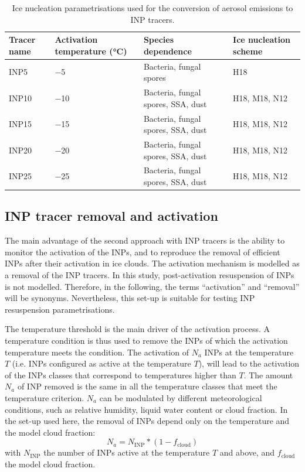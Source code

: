      \begin{table}[htb]
        \centering
        \caption{Ice nucleation parametrisations used for the conversion of aerosol emissions to INP tracers.}
        \begin{tabular}{m{2.5cm}|m{2.75cm}m{6cm}m{3cm}}
        \toprule
        Tracer name & Activation temperature (°C) & Species dependence  &  Ice nucleation scheme \\
        \midrule
        INP5 & \num{-5} & Bacteria, fungal spores & H18 \\
        INP10 & \num{-10} & Bacteria, fungal spores, SSA, dust & H18, M18, N12 \\
        INP15 & \num{-15} & Bacteria, fungal spores, SSA, dust & H18, M18, N12 \\
        INP20 & \num{-20} & Bacteria, fungal spores, SSA, dust  & H18, M18, N12 \\
        INP25 & \num{-25} & Bacteria, fungal spores, SSA, dust  & H18, M18, N12 \\
        \bottomrule
        \end{tabular}
        \label{tab:param_emiss_inp}
    \end{table}

    \subsection{INP tracer removal and activation}
    \label{sec:removal}
    The main advantage of the second approach with INP tracers is the ability to monitor the activation of the INPs, and to reproduce the removal of efficient INPs after their activation in ice clouds.
    The activation mechanism is modelled as a removal of the INP tracers. 
    In this study, post-activation resuspension of INPs is not modelled. Therefore, in the following, the terms ``activation'' and ``removal'' will be synonyms. 
    Nevertheless, this set-up is suitable for testing INP resuspension parametrisations.
    
    The temperature threshold is the main driver of the activation process. A temperature condition is thus used to remove the INPs of which the activation temperature meets the condition.
    The activation of $N_a$ INPs at the temperature $T$ (i.e. INPs configured as active at the temperature $T$), will lead to the activation of the INPs classes that correspond to temperatures higher than $T$.
    The amount $N_a$ of INP removed is the same in all the temperature classes that meet the temperature criterion.
    $N_a$ can be modulated by different meteorological conditions, such as relative humidity, liquid water content or cloud fraction. %
    In the set-up used here, the removal of INPs depend only on the temperature and the model cloud fraction:
    \begin{equation}
        N_a = N_{\text{INP}} * (1-f_{\text{cloud}})
    \end{equation}
    with $N_{\text{INP}}$ the number of INPs active at the temperature $T$ and above, and $f_{\text{cloud}}$ the model cloud fraction.
    
